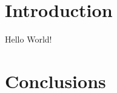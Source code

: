 \documentclass[12 pt]{article}
\begin{document}


\section{Introduction}
Hello World!\cite{einstein, examplebook}


\section{Conclusions}



\clearpage
{}


\end{document}
